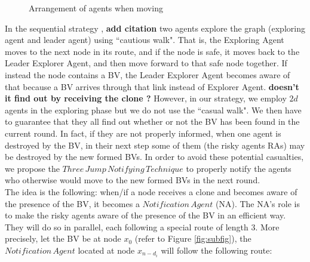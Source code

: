 \begin{figure} [H]
  \centering 
  \hspace{1in} 
  \caption{Arrangement of agents when moving} 
  \label{fig:subfig1} %
\end{figure}

In the sequential strategy \cite{Alotaibi}, {\bf add citation} two agents explore the graph (exploring agent and leader agent)  using  ``cautious walk". That is, the Exploring Agent moves to the next node in its route, and if the node is safe, it moves back to the Leader Explorer Agent, and then move forward to that safe node together. If instead the node contains a BV, the Leader Explorer Agent becomes aware of that because a BV arrives through that link instead of Explorer Agent. {\bf doesn't it find out by receiving the clone ?}
However, in our strategy, we employ $2d$ agents in the exploring phase but we do not use the ``casual walk". We then have to guarantee that they all find out whether or not the BV has been found in the current round. In fact, if they are not properly informed, when one agent is destroyed by the BV, in their next step some of them (the risky agents RAs) may be destroyed by the new formed BVs. In order to avoid these potential casualties, we propose the $Three\,Jump\,Notifying\,Technique$ to properly notify the agents who otherwise would move to the new formed BVs in the next round.\\

The idea is the following: when/if a node receives a clone and becomes aware of the presence of the BV,  it becomes a  $Notification\,Agent$ (NA). The NA's role is to make the risky agents aware of the presence of the BV in an efficient way. They will do so in parallel, each following  a special  route of length 3.  More precisely, let the BV be at node $x_0$ (refer to Figure \ref{fig:subfig}), the $Notification\,Agent$ located at node $x_{n-d_i}$ will follow the following route:

